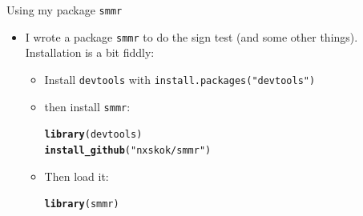 \documentclass[unknownkeysallowed]{beamer}\usepackage[]{graphicx}\usepackage[]{color}
\makeatletter
\newcommand{\hlstr}[1]{\textcolor[rgb]{0.192,0.494,0.8}{#1}}%
\newcommand{\hlstd}[1]{\textcolor[rgb]{0.345,0.345,0.345}{#1}}%
\newcommand{\hlkwd}[1]{\textcolor[rgb]{0.737,0.353,0.396}{\textbf{#1}}}%
\newenvironment{kframe}{%
 \def\at@end@of@kframe{}%
 \ifinner\ifhmode%
  \def\at@end@of@kframe{\end{minipage}}%
  \begin{minipage}{\columnwidth}%
 \fi\fi%
 \def\FrameCommand##1{\hskip\@totalleftmargin \hskip-\fboxsep
 \colorbox{shadecolor}{##1}\hskip-\fboxsep
     \hskip-\linewidth \hskip-\@totalleftmargin \hskip\columnwidth}%
 \MakeFramed {\advance\hsize-\width
   \@totalleftmargin\z@ \linewidth\hsize
   \@setminipage}}%
 {\par\unskip\endMakeFramed%
 \at@end@of@kframe}
\newenvironment{knitrout}{}{} %
\makeatother
\begin{document}
\begin{frame}[fragile]{Using my package \texttt{smmr}}
  
  \begin{itemize}
  \item I wrote a package \texttt{smmr} to do the sign
    test (and some other things). Installation is a bit fiddly:
    \begin{itemize}
    \item Install \texttt{devtools} with
      \texttt{install.packages("devtools")}
    \item then install \texttt{smmr}:
\begin{knitrout}
\color{fgcolor}\begin{kframe}
\begin{alltt}
\hlkwd{library}\hlstd{(devtools)}
\hlkwd{install_github}\hlstd{(}\hlstr{"nxskok/smmr"}\hlstd{)}
\end{alltt}
\end{kframe}
\end{knitrout}
\item Then load it:
\begin{knitrout}
\color{fgcolor}\begin{kframe}
\begin{alltt}
\hlkwd{library}\hlstd{(smmr)}
\end{alltt}
\end{kframe}
\end{knitrout}
    \end{itemize}
  \end{itemize}
  
\end{frame}
\end{document}
